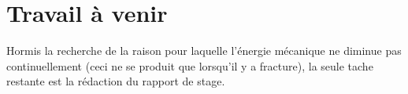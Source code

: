 \documentclass[
  french,
	11pt, %
]{fphw}
\begin{document}
\section*{Travail à venir}


Hormis la recherche de la raison pour laquelle l'énergie mécanique ne diminue pas continuellement (ceci ne se produit que lorsqu'il y a fracture), la seule tache restante est la rédaction du rapport de stage.



\clearpage   %
\printbibliography
\end{document}
